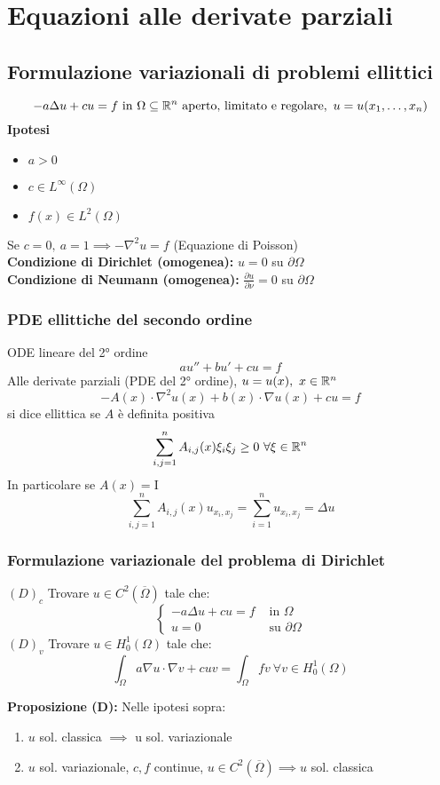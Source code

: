 
\section{Equazioni alle derivate parziali}
\subsection{Formulazione variazionali di problemi ellittici}
\[-a\Delta u+cu=f\text{ in }\Omega\subseteq  \R^n\text{ aperto, limitato e regolare},\ u=u(x_1,\ldots,x_n)\]
\textbf{Ipotesi}
\begin{itemize}
	\item $a>0$ 
	\item $c\in L^{\infty}(\Omega)$ 
	\item $f(x)\in L^{2}(\Omega)$
\end{itemize}
Se $c=0,\ a=1\implies -\nabla ^2 u=f$ (Equazione di Poisson)\\
\textbf{Condizione di Dirichlet (omogenea):} $u=0$ su $\partial\Omega$
\\\textbf{Condizione di Neumann (omogenea):} $\frac{\partial u}{\partial \nu} =0$ su $\partial\Omega$
\subsubsection{PDE ellittiche del secondo ordine}
ODE lineare del 2° ordine
\[au''+bu'+cu=f\]
Alle derivate parziali (PDE del 2° ordine), $u=u(x),\ x\in \mathbb{R}^n$
\[-A(x)\cdot \nabla ^2 u(x)+b(x)\cdot \nabla u(x)+cu=f\]
si dice ellittica se $A$ è definita positiva
\[\sum_{i,j=1}^{n} A_{i,j}(x)\xi_i\xi_j\ge 0\ \forall \xi \in \mathbb{R}^n\]
In particolare se $A(x)=\text{I}$ 
\[\sum_{i,j=1}^{n} A_{i,j}(x)u_{x_i,x_j}=\sum_{i=1}^{n} u_{x_i,x_j}=\Delta u\]
\subsubsection{Formulazione variazionale del problema di Dirichlet}
$(D)_c$ Trovare $u\in C^2(\overline\Omega)$ tale che:
\[\begin{cases}
	-a\Delta u+cu=f&\text{ in }\Omega
	\\u=0&\text{ su }\partial \Omega
\end{cases}\]
$(D)_v$ Trovare $u\in H_0^1(\Omega)$ tale che:
\[\int_{\Omega}^{} a\nabla u\cdot \nabla v+cuv=\int_{\Omega}^{}fv \ \forall v\in H_0^1(\Omega)\]
\begin{tcolorbox}
	\textbf{Proposizione (D):} Nelle ipotesi sopra:
	\begin{enumerate}
		\item $u$ sol. classica $\implies $ u sol. variazionale
		\item $u$ sol. variazionale, $c,f$ continue, $u\in C^2(\overline\Omega)\implies u$ sol. classica
	\end{enumerate}
\end{tcolorbox}

